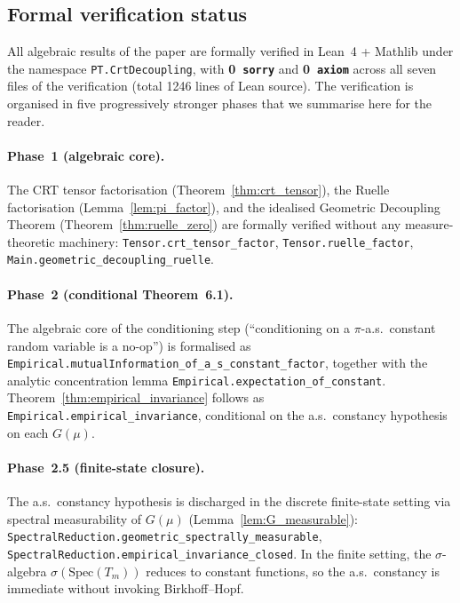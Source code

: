 \subsection{Formal verification status}
\label{ssec:formal_verification}

All algebraic results of the paper are formally verified in Lean~4
+ Mathlib under the namespace \texttt{PT.CrtDecoupling}, with
\textbf{0~\texttt{sorry}} and \textbf{0~\texttt{axiom}} across all
seven files of the verification (total 1246 lines of Lean source).
The verification is organised in five progressively stronger phases
that we summarise here for the reader.

\paragraph{Phase~1 (algebraic core).}
The CRT tensor factorisation
(Theorem~\ref{thm:crt_tensor}), the Ruelle factorisation
(Lemma~\ref{lem:pi_factor}), and the idealised Geometric Decoupling
Theorem (Theorem~\ref{thm:ruelle_zero}) are formally verified
without any measure-theoretic machinery:
\texttt{Tensor.crt\_tensor\_factor}, \texttt{Tensor.ruelle\_factor},
\texttt{Main.geometric\_decoupling\_ruelle}.

\paragraph{Phase~2 (conditional Theorem~6.1).}
The algebraic core of the conditioning step
(``conditioning on a $\pi$-a.s.\ constant random variable is a
no-op'') is formalised as
\texttt{Empirical.mutualInformation\_of\_a\_s\_constant\_factor}, together
with the analytic concentration lemma
\texttt{Empirical.expectation\_of\_constant}. Theorem~\ref{thm:empirical_invariance}
follows as \texttt{Empirical.empirical\_invariance}, conditional on
the a.s.\ constancy hypothesis on each $G(\mu)$.

\paragraph{Phase~2.5 (finite-state closure).}
The a.s.\ constancy hypothesis is discharged in the discrete
finite-state setting via spectral measurability of $G(\mu)$
(Lemma~\ref{lem:G_measurable}):
\texttt{SpectralReduction.geometric\_spectrally\_measurable},
\texttt{SpectralReduction.empirical\_invariance\_closed}. In the
finite setting, the $\sigma$-algebra $\sigma(\mathrm{Spec}(T_m))$
reduces to constant functions, so the a.s.\ constancy is immediate
without invoking Birkhoff--Hopf.


